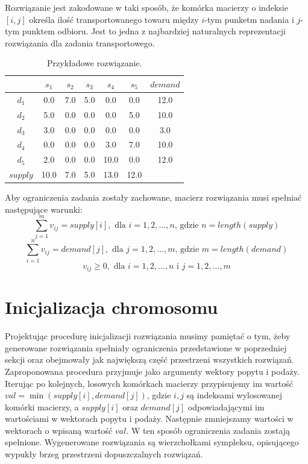 Rozwiązanie jest zakodowane w taki sposób, że komórka macierzy o indeksie $[i, j]$ określa ilość transportowanego towaru 
między $i$-tym punketm nadania i $j$-tym punktem odbioru. Jest to jedna z najbardziej naturalnych reprezentacji rozwiązania 
dla zadania transportowego.

\begin{table}[h!]
    \begin{center}
        \begin{tabular}{c||ccccc||c}
              & $s_1$ & $s_2$ & $s_3$ & $s_4$ & $s_5$ & $demand$ \\ 
            \hline
            \hline
            $d_1$ & 0.0 & 7.0 & 5.0 & 0.0 & 0.0 & 12.0 \\
            $d_2$ & 5.0 & 0.0 & 0.0 & 0.0 & 5.0 & 10.0 \\
            $d_3$ & 3.0 & 0.0 & 0.0 & 0.0 & 0.0 & 3.0 \\
            $d_4$ & 0.0 & 0.0 & 0.0 & 3.0 & 7.0 & 10.0 \\
            $d_5$ & 2.0 & 0.0 & 0.0 & 10.0 & 0.0 & 12.0 \\
            \hline
            \hline
            $supply$ & 10.0 & 7.0 & 5.0 & 13.0 & 12.0 & \\ 
        \end{tabular}
    \end{center}
    \caption{Przykładowe rozwiązanie.}
\end{table}

Aby ograniczenia zadania zostały zachowane, macierz rozwiązania musi spełniać następujące warunki:
$$\sum_{j=1}^{m} v_{ij} = supply[i], \text{ dla } i = 1, 2, \dots, n \text{, gdzie } n = length(supply)$$
$$\sum_{i=1}^{n} v_{ij} = demand[j], \text{ dla } j = 1, 2, \dots, m \text{, gdzie } m = length(demand)$$
$$v_{ij} \ge 0, \text{ dla } i = 1, 2, \dots, n \text{ i } j = 1, 2, \dots, m$$


\section{Inicjalizacja chromosomu}
Projektując procedurę inicjalizacji rozwiązania musimy pamiętać o tym, żeby generowane rozwiązania spełniały ograniczenia przedstawione 
w poprzedniej sekcji oraz obejmowały jak największą część przestrzeni wszystkich rozwiązań. Zaproponowana procedura przyjmuje jako argumenty 
wektory popytu i podaży. Iterując po kolejnych, losowych komórkach macierzy przypisujemy im wartość $val = \min(supply[i], demand[j])$, gdzie 
$i, j$ są indeksami wylosowanej komórki macierzy, a $supply[i]$ oraz $demand[j]$ odpowiadającymi im wartościami w wektorach popytu i podaży. 
Następnie zmniejszamy wartości w wektorach o wpisaną wartość $val$. W ten sposób ograniczenia zadania zostają spełnione. Wygenerowane rozwiązania są 
wierzchołkami sympleksu, opisującego wypukły brzeg przestrzeni dopuszczalnych rozwiązań.

